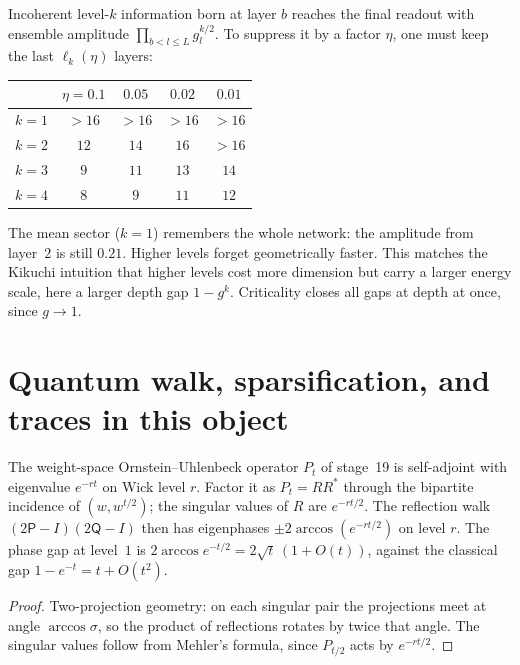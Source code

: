 \begin{corollary}\label{cor:loc}
Incoherent level-$k$ information born at layer $b$ reaches the final readout with ensemble amplitude
$\prod_{b<l\le L}g_l^{k/2}$. To suppress it by a factor $\eta$, one must keep the last $\ell_k(\eta)$ layers:
\begin{center}\small
\begin{tabular}{@{}lcccc@{}}\toprule
 & $\eta=0.1$ & $0.05$ & $0.02$ & $0.01$\\\midrule
$k=1$ & $>16$ & $>16$ & $>16$ & $>16$\\
$k=2$ & $12$ & $14$ & $16$ & $>16$\\
$k=3$ & $9$ & $11$ & $13$ & $14$\\
$k=4$ & $8$ & $9$ & $11$ & $12$\\\bottomrule
\end{tabular}
\end{center}
\end{corollary}

The mean sector ($k=1$) remembers the whole network: the amplitude from layer~$2$ is still $0.21$. Higher
levels forget geometrically faster. This matches the Kikuchi intuition that higher levels cost more
dimension but carry a larger energy scale, here a larger depth gap $1-g^k$. Criticality closes all gaps at
depth at once, since $g\to1$.

\section{Quantum walk, sparsification, and traces in this object}\label{sec:qw}
\begin{proposition}\label{prop:szegedy}
The weight-space Ornstein--Uhlenbeck operator $P_t$ of stage~19 is self-adjoint with eigenvalue $e^{-rt}$ on Wick
level $r$. Factor it as $P_t=RR^*$ through the bipartite incidence of $(w,w^{t/2})$; the singular values of
$R$ are $e^{-rt/2}$. The reflection walk $(2\mathsf P-I)(2\mathsf Q-I)$ then has eigenphases $\pm2\arccos(e^{-rt/2})$ on level
$r$. The phase gap at level~$1$ is $2\arccos e^{-t/2}=2\sqrt t\,(1+O(t))$, against the classical gap $1-e^{-t}=t+O(t^2)$.
\end{proposition}
\begin{proof}
Two-projection geometry: on each singular pair the projections meet at angle $\arccos\sigma$, so the product of
reflections rotates by twice that angle. The singular values follow from Mehler's formula, since $P_{t/2}$
acts by $e^{-rt/2}$.
\end{proof}


